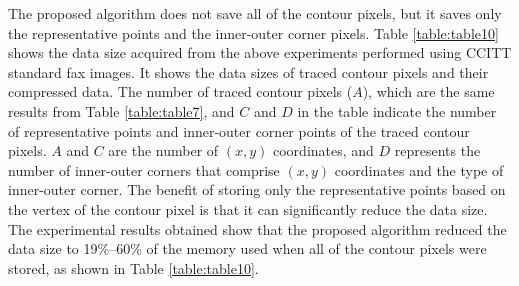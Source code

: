\documentclass[sensors,article,accept,moreauthors,pdftex,10pt,a4paper]{mdpi}
\begin{document}
The proposed algorithm does not save all of the contour pixels, but it saves only the representative points and the inner-outer corner pixels. Table \ref{table:table10} shows the data size acquired from the above experiments performed using CCITT standard fax images. It shows the data sizes of traced contour pixels and their compressed data. The number of traced contour pixels ($A$), which are the same results from Table \ref{table:table7}, and $C$ and $D$ in the table indicate the number of representative points and inner-outer corner points of the traced contour pixels. $A$ and $C$ are the number of $(x, y)$ coordinates, and $D$ represents the number of inner-outer corners that comprise $(x, y)$ coordinates and the type of inner-outer corner. The benefit of storing only the representative points based on the vertex of the contour pixel is that it can significantly reduce the data size. The experimental results obtained show that the proposed algorithm reduced the data size to 19\%--60\% of the memory used when all of the contour pixels were stored, as shown in Table \ref{table:table10}.


\end{document}
